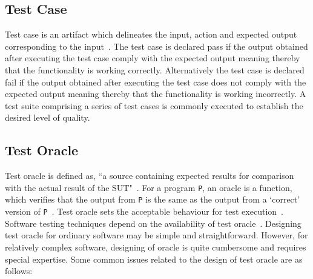 \subsection{Test Case}
Test case is an artifact which delineates the input, action and expected output corresponding to the input~\cite{ahmed2010software}. The test case is declared pass if the output obtained after executing the test case comply with the expected output meaning thereby that the functionality is working correctly. Alternatively the test case is declared fail if the output obtained after executing the test case does not comply with the expected output meaning thereby that the functionality is working incorrectly. %
A test suite comprising a series of test cases is commonly executed to establish the desired level of quality.


\subsection{Test Oracle}
Test oracle is defined as, ``a source containing expected results for comparison with the actual result of the SUT"~\cite{ahmed2010software}. For a program \verb+P+, an oracle is a function, which verifies that the output from \verb+P+ is the same as the output from a ‘correct’ version of \verb+P+~\cite{howden1986functional}. Test oracle sets the acceptable behaviour for test execution~\cite{baresi2001test}. Software testing techniques depend on the availability of test oracle~\cite{gaudel2010software}. Designing test oracle for ordinary software may be simple and straightforward. However, for relatively complex software, designing of oracle is quite cumbersome and requires special expertise. 
Some common issues related to the design of test oracle are as follows:

